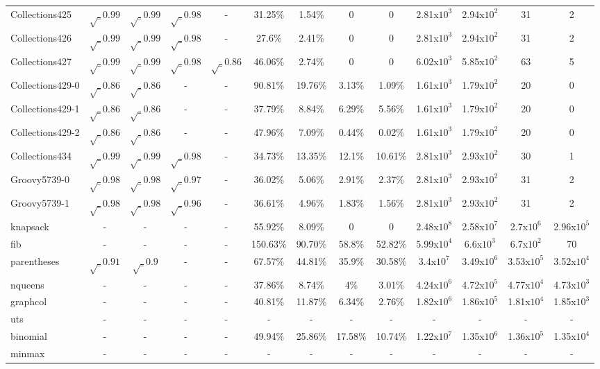 \begin{table}[h!]
\begin{tabular}{lcccccccccccc}
    Collections425   & $\surd_{0.99}$ & $\surd_{0.99}$ & $\surd_{0.98}$ & - & 31.25\% & 1.54\% & 0 & 0 & 2.81x${10^3}$ & 2.94x${10^2}$ & 31 & 2 \\
    Collections426   & $\surd_{0.99}$ & $\surd_{0.99}$ & $\surd_{0.98}$ & - & 27.6\% & 2.41\% & 0 & 0 & 2.81x${10^3}$ & 2.94x${10^2}$ & 31 & 2 \\
    Collections427   & $\surd_{0.99}$ & $\surd_{0.99}$ & $\surd_{0.98}$ & $\surd_{0.86}$ & 46.06\% & 2.74\% & 0 & 0 & 6.02x${10^3}$ & 5.85x${10^2}$ & 63 & 5 \\
    Collections429-0 & $\surd_{0.86}$ & $\surd_{0.86}$ & - & - & 90.81\% & 19.76\% & 3.13\% & 1.09\% & 1.61x${10^3}$ & 1.79x${10^2}$ & 20 & 0 \\
    Collections429-1 & $\surd_{0.86}$ & $\surd_{0.86}$ & - & - & 37.79\% & 8.84\% & 6.29\% & 5.56\% & 1.61x${10^3}$ & 1.79x${10^2}$ & 20 & 0 \\
    Collections429-2 & $\surd_{0.86}$ & $\surd_{0.86}$ & - & - & 47.96\% & 7.09\% & 0.44\% & 0.02\% & 1.61x${10^3}$ & 1.79x${10^2}$ & 20 & 0 \\
    Collections434   & $\surd_{0.99}$ & $\surd_{0.99}$ & $\surd_{0.98}$ & - & 34.73\% & 13.35\% & 12.1\% & 10.61\% & 2.81x${10^3}$ & 2.93x${10^2}$ & 30 & 1 \\
    \midrule
    Groovy5739-0     & $\surd_{0.98}$ & $\surd_{0.98}$ & $\surd_{0.97}$ & - & 36.02\% & 5.06\% & 2.91\% & 2.37\% & 2.81x${10^3}$ & 2.93x${10^2}$ & 31 & 2 \\
    Groovy5739-1     & $\surd_{0.98}$ & $\surd_{0.98}$ & $\surd_{0.96}$ & - & 36.61\% & 4.96\% & 1.83\% & 1.56\% & 2.81x${10^3}$ & 2.93x${10^2}$ & 31 & 2 \\
    \midrule
    \midrule
    knapsack     & - & - & - & - & 55.92\% & 8.09\% & 0 & 0 & 2.48x${10^8}$ & 2.58x$10^{7}$ & 2.7x$10^{6}$ & 2.96x$10^{5}$ \\
    fib     & - & - & - & - & 150.63\% & 90.70\% & 58.8\% & 52.82\% & 5.99x${10^4}$ & 6.6x${10^3}$ & 6.7x$10^{2}$ & 70 \\
    parentheses  & $\surd_{0.91}$ & $\surd_{0.9}$ & - & - & 67.57\% & 44.81\% & 35.9\% & 30.58\% & 3.4x${10^7}$ & 3.49x${10^6}$ & 3.53x$10^{5}$ & 3.52x$10^{4}$ \\
    nqueens    & - & - & - & - & 37.86\% & 8.74\% & 4\% & 3.01\% & 4.24x${10^6}$ & 4.72x${10^5}$ & 4.77x$10^{4}$ & 4.73x$10^{3}$ \\
    graphcol  & - & - & - & - & 40.81\% & 11.87\% & 6.34\% & 2.76\% & 1.82x${10^6}$ & 1.86x${10^5}$ & 1.81x$10^{4}$ & 1.85x$10^{3}$ \\
    uts     & - & - & - & - & - & - & - & - & - & - & - & - \\
    binomial & - & - & - & - & 49.94\% & 25.86\% & 17.58\% & 10.74\% & 1.22x${10^7}$ & 1.35x${10^6}$ & 1.36x$10^{5}$ & 1.35x$10^{4}$ \\
    minmax    & - & - & - & - & - & - & - & - & - & - & - & - \\



\end{tabular}
\end{table}

